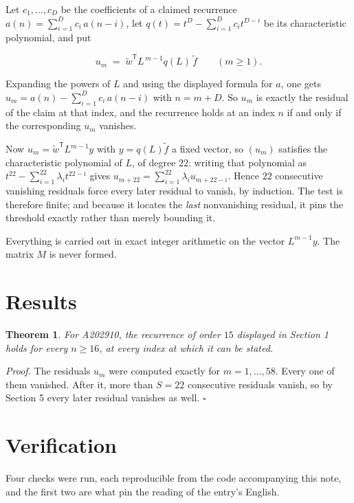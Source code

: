 \documentclass[11pt]{article}
\newtheorem{theorem}{Theorem}
\theoremstyle{definition}
\begin{document}
Let $c_1,\dots,c_D$ be the coefficients of a claimed recurrence $a(n) = \sum_{i=1}^{D} c_i\,a(n-i)$, let $q(t) = t^{D} - \sum_{i=1}^{D} c_i t^{D-i}$ be its characteristic polynomial, and put

\[u_m \;=\; \tilde w^{\mathsf T} L^{\,m-1} q(L)\,\tilde f \qquad (m \ge 1).\]

Expanding the powers of $L$ and using the displayed formula for $a$, one gets $u_m = a(n) - \sum_{i=1}^{D} c_i\,a(n-i)$ with $n = m + D$. So $u_m$ is exactly the residual of the claim at that index, and the recurrence holds at an index $n$ if and only if the corresponding $u_m$ vanishes.

Now $u_m = \tilde w^{\mathsf T} L^{m-1} y$ with $y = q(L)\tilde f$ a fixed vector, so $(u_m)$ satisfies the characteristic polynomial of $L$, of degree $22$: writing that polynomial as $t^{22} - \sum_{i=1}^{22} \lambda_i t^{22-i}$ gives $u_{m+22} = \sum_{i=1}^{22} \lambda_i u_{m+22-i}$. Hence $22$ consecutive vanishing residuals force every later residual to vanish, by induction. The test is therefore finite; and because it locates the {\itshape last} nonvanishing residual, it pins the threshold exactly rather than merely bounding it.

Everything is carried out in exact integer arithmetic on the vector $L^{m-1}y$. The matrix $M$ is never formed.

\section{Results}

\begin{theorem} For A202910, the recurrence of order $15$ displayed in Section 1 holds for every $n \ge 16$, at every index at which it can be stated.\end{theorem}

{\itshape Proof.} The residuals $u_m$ were computed exactly for $m = 1,\dots,58$. Every one of them vanished. After it, more than $S = 22$ consecutive residuals vanish, so by Section 5 every later residual vanishes as well. $\square$

\section{Verification}

Four checks were run, each reproducible from the code accompanying this note, and the first two are what pin the reading of the entry's English.
\end{document}
